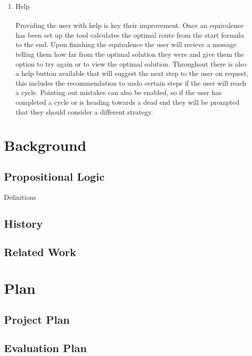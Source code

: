\documentclass{report}
\begin{document}
\begin{enumerate}
\item Help
\\\\Providing the user with help is key their improvement. Once an equivalence has been set up the tool calculates the optimal route from the start formula to the end. Upon finishing the equivalence the user will recieve a message telling them how far from the optimal solution they were and give them the option to try again or to view the optimal solution. Throughout there is also a help button available that will suggest the next step to the user on request, this includes the recommendation to undo certain steps if the user will reach a cycle. Pointing out mistakes can also be enabled, so if the user has completed a cycle or is heading towards a dead end they will be prompted that they should consider a different strategy.

\end{enumerate}


\chapter{Background}

\section{Propositional Logic}

Definitions

\section{History}


\section{Related Work}



\chapter{Plan}



\section{Project Plan}



\section{Evaluation Plan}
\end{document}
